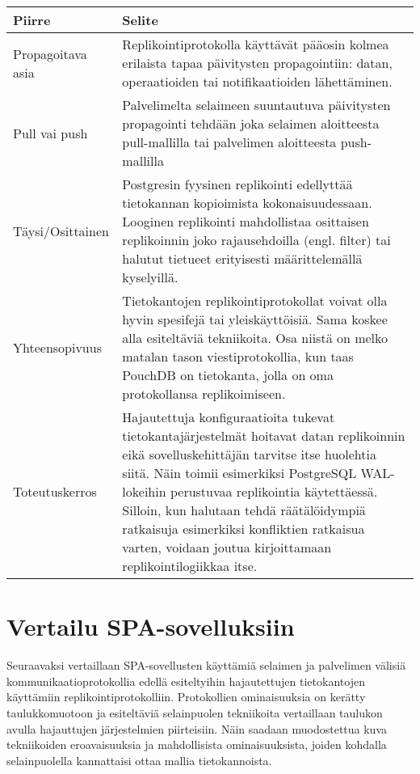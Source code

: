 \documentclass[finnish,twoside,censored,csm,sw-track-2018]{HYthesisML}
\begin{document}
\begin{center}
\begin{tabular}{ | m{3cm} | m{12cm} | } 
 \hline
 \textbf{Piirre} & \textbf{Selite}\\ 
 \hline
 Propagoitava asia & Replikointiprotokolla käyttävät pääosin kolmea erilaista tapaa päivitysten propagointiin: datan, operaatioiden tai notifikaatioiden lähettäminen. \\
 \hline
 Pull vai push & Palvelimelta selaimeen suuntautuva päivitysten propagointi tehdään joka selaimen aloitteesta pull-mallilla tai palvelimen aloitteesta push-mallilla \\
 \hline
 Täysi/Osittainen & Postgresin fyysinen replikointi edellyttää tietokannan kopioimista kokonaisuudessaan. Looginen replikointi mahdollistaa osittaisen replikoinnin joko rajausehdoilla (engl. filter) tai halutut tietueet erityisesti määrittelemällä kyselyillä.\\
 \hline
 Yhteensopivuus & Tietokantojen replikointiprotokollat voivat olla hyvin spesifejä tai yleiskäyttöisiä. Sama koskee alla esiteltäviä tekniikoita. Osa niistä on melko matalan tason viestiprotokollia, kun taas PouchDB on tietokanta, jolla on oma protokollansa replikoimiseen.\\
 \hline
 Toteutuskerros & Hajautettuja konfiguraatioita tukevat tietokantajärjestelmät hoitavat datan replikoinnin eikä sovelluskehittäjän tarvitse itse huolehtia siitä. Näin toimii esimerkiksi PostgreSQL WAL-lokeihin perustuvaa replikointia käytettäessä. Silloin, kun halutaan tehdä räätälöidympiä ratkaisuja esimerkiksi konfliktien ratkaisua varten, voidaan joutua kirjoittamaan replikointilogiikkaa itse.\\
 \hline
\end{tabular}
\end{center}

\section{Vertailu SPA-sovelluksiin}

Seuraavaksi vertaillaan SPA-sovellusten käyttämiä selaimen ja palvelimen välisiä kommunikaatioprotokollia edellä esiteltyihin hajautettujen tietokantojen käyttämiin replikointiprotokolliin. Protokollien ominaisuuksia on kerätty taulukkomuotoon ja esiteltäviä selainpuolen tekniikoita vertaillaan taulukon avulla hajauttujen järjestelmien piirteisiin. Näin saadaan muodostettua kuva tekniikoiden eroavaisuuksia ja mahdollisista ominaisuuksista, joiden kohdalla selainpuolella kannattaisi ottaa mallia tietokannoista.
\end{document}
